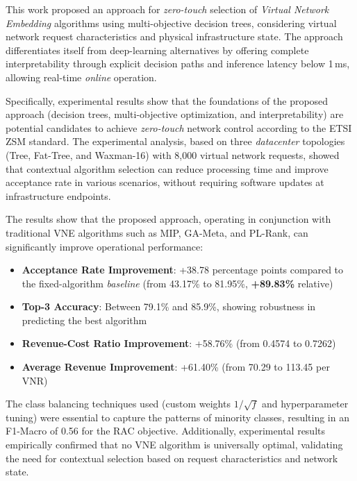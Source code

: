 \documentclass[runningheads]{llncs}
\begin{document}
This work proposed an approach for \textit{zero-touch} selection of \textit{Virtual Network Embedding} algorithms using multi-objective decision trees, considering virtual network request characteristics and physical infrastructure state.
The approach differentiates itself from deep-learning alternatives by offering complete interpretability through explicit decision paths and inference latency below 1\,ms, allowing real-time \textit{online} operation.

Specifically, experimental results show that the foundations of the proposed approach (decision trees, multi-objective optimization, and interpretability) are potential candidates to achieve \textit{zero-touch} network control according to the ETSI ZSM standard.
The experimental analysis, based on three \textit{datacenter} topologies (Tree, Fat-Tree, and Waxman-16) with 8,000 virtual network requests, showed that contextual algorithm selection can reduce processing time and improve acceptance rate in various scenarios, without requiring software updates at infrastructure endpoints.

The results show that the proposed approach, operating in conjunction with traditional VNE algorithms such as MIP, GA-Meta, and PL-Rank, can significantly improve operational performance:
\begin{itemize}
    \item \textbf{Acceptance Rate Improvement}: +38.78 percentage points compared to the fixed-algorithm \textit{baseline} (from 43.17\% to 81.95\%, \textbf{+89.83\%} relative)
    \item \textbf{Top-3 Accuracy}: Between 79.1\% and 85.9\%, showing robustness in predicting the best algorithm
    \item \textbf{Revenue-Cost Ratio Improvement}: +58.76\% (from 0.4574 to 0.7262)
    \item \textbf{Average Revenue Improvement}: +61.40\% (from 70.29 to 113.45 per VNR)
\end{itemize}

The class balancing techniques used (custom weights $1/\sqrt{f}$ and hyperparameter tuning) were essential to capture the patterns of minority classes, resulting in an F1-Macro of 0.56 for the RAC objective.
Additionally, experimental results empirically confirmed that no VNE algorithm is universally optimal, validating the need for contextual selection based on request characteristics and network state.
\end{document}
